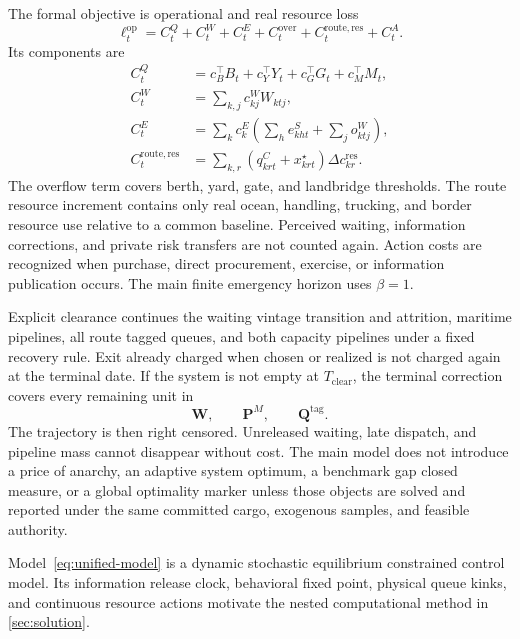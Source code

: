\documentclass[a4paper,fleqn]{cas-sc}
\begin{document}
\pagebreak
The formal objective is operational and real resource loss
\begin{equation}
 \ell_t^{\mathrm{op}}=
 C_t^Q+C_t^W+C_t^E+C_t^{\mathrm{over}}
 +C_t^{\mathrm{route,res}}+C_t^A.
 \label{eq:stage-loss}
\end{equation}
Its components are
\begin{subequations}\label{eq:loss-components}
\begin{align}
 C_t^Q
 &=c_B^\top B_t+c_Y^\top Y_t
 +c_G^\top G_t+c_M^\top M_t,\\
 C_t^W
 &=\sum_{k,j}c^W_{kj}W_{ktj},\\
 C_t^E
 &=\sum_kc^E_k\left(
 \sum_he^S_{kht}+\sum_jo^W_{ktj}
 \right),\\
 C_t^{\mathrm{route,res}}
 &=\sum_{k,r}
 \left(q^C_{krt}+x^\star_{krt}\right)
 \Delta c^{\mathrm{res}}_{kr}.
\end{align}
\end{subequations}
The overflow term covers berth, yard, gate, and landbridge thresholds.
The route resource increment contains only real ocean, handling, trucking, and
border resource use relative to a common baseline. Perceived waiting,
information corrections, and private risk transfers are not counted again.
Action costs are recognized when purchase, direct procurement, exercise, or
information publication occurs. The main finite emergency horizon uses
$\beta=1$.

Explicit clearance continues the waiting vintage transition and attrition,
maritime pipelines, all route tagged queues, and both capacity pipelines under
a fixed recovery rule. Exit already charged when chosen or realized is not
charged again at the terminal date. If the system is not empty at
$T_{\mathrm{clear}}$, the terminal correction covers every remaining unit in
\begin{equation}
 \mathbf W,\qquad\mathbf P^M,\qquad
 \mathbf Q^{\mathrm{tag}}.
 \label{eq:terminal-mass}
\end{equation}
The trajectory is then right censored. Unreleased waiting, late dispatch, and
pipeline mass cannot disappear without cost. The main model does not introduce
a price of anarchy, an adaptive system optimum, a benchmark gap closed measure,
or a global optimality marker unless those objects are solved and reported
under the same committed cargo, exogenous samples, and feasible authority.

Model~\eqref{eq:unified-model} is a dynamic stochastic equilibrium constrained
control model. Its information release clock, behavioral fixed point, physical
queue kinks, and continuous resource actions motivate the nested computational
method in \cref{sec:solution}.
\end{document}
